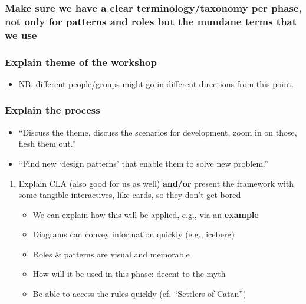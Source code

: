 \documentclass[11pt]{article}
\begin{document}
\subsubsection{Make sure we have a clear terminology/taxonomy per phase, not only for patterns and roles but the mundane terms that we use}
\label{sec:org502a528}
\subsubsection{Explain theme of the workshop}
\label{sec:orgcffff23}
\begin{itemize}
\item NB. different people/groups might go in different directions from this point.
\end{itemize}
\subsubsection{Explain the process}
\label{sec:orga40a5c2}
\begin{itemize}
\item ``Discuss the theme, discuss the scenarios for development, zoom in on those, flesh them out.''
\item ``Find new ‘design patterns’ that enable them to solve new problem.''
\end{itemize}
\begin{enumerate}
\item Explain CLA (also good for us as well) \textbf{and/or} present the framework with some tangible interactives, like cards, so they don’t get bored
\label{sec:org0f21535}
\begin{itemize}
\item We can explain how this will be applied, e.g., via an \textbf{example}
\item Diagrams can convey information quickly (e.g., iceberg)
\item Roles \& patterns are visual and memorable
\item How will it be used in this phase: decent to the myth
\item Be able to access the rules quickly (cf. ``Settlers of Catan'')
\end{itemize}
\end{enumerate}
\end{document}
